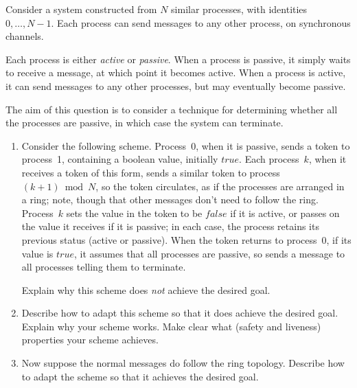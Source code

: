\begin{question}
Consider a system constructed from $N$ similar processes, with identities
$0, \ldots, N-1$.  Each process can send messages to any other process, on
synchronous channels.

Each process is either \emph{active} or \emph{passive}.  When a process is
passive, it simply waits to receive a message, at which point it becomes
active.  When a process is active, it can send messages to any other
processes, but may eventually become passive.

The aim of this question is to consider a technique for determining whether
all the processes are passive, in which case the system can terminate.

\begin{enumerate}
\item Consider the following scheme.  Process~0, when it is passive, sends a
token to process~1, containing a boolean value, initially $true$.  Each
process~$k$, when it receives a token of this form, sends a similar token to
process~$(k+1) \bmod N$, so the token circulates, as if the processes are
arranged in a ring; note, though that other messages don't need to follow the
ring.  Process~$k$ sets the value in the token to be $false$ if it is active,
or passes on the value it receives if it is passive; in each case, the process
retains its previous status (active or passive).  When the token returns to
process~0, if its value is $true$, it assumes that all processes are passive,
so sends a message to all processes telling them to terminate.

Explain why this scheme does \emph{not} achieve the desired goal.


\item
Describe how to adapt this scheme so that it does achieve the desired goal.
Explain why your scheme works.  Make clear what (safety and liveness)
properties your scheme achieves.


\item
Now suppose the normal messages do follow the ring topology.  Describe how to
adapt the scheme so that it achieves the desired goal. 

\end{enumerate}
\end{question}

